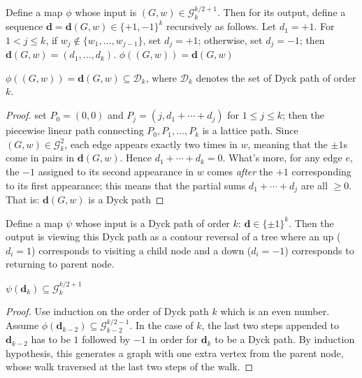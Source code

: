 \begin{definition}\label{def:graph_to_Dyck_map}
   Define a map $\phi$ whose input is $(G, w) \in \mathcal{G}^{k/2 + 1}_k$. Then for its output,
   define a sequence $\mathbf{d}=\mathbf{d}(G,w)\in\{+1,-1\}^k$ recursively as follows.
   Let $d_1=+1$.  For $1<j\le k$, if $w_j\notin\{w_1,\ldots,w_{j-1}\}$, set $d_j=+1$; otherwise, set $d_j=-1$; then
   $\mathbf{d}(G,w) = (d_1,\ldots,d_k)$. $\phi((G,w)) = \mathbf{d}(G,w)$
\end{definition}


\begin{lemma}\label{lem:graph_Dyck_correspondence}
  $\phi((G,w)) = \mathbf{d}(G,w) \subseteq \mathcal{D}_k$, where $\mathcal{D}_k$ denotes the set of Dyck path of order $k$.
  \begin{proof}
    set $P_0 = (0,0)$ and $P_j = (j,d_1+\cdots+d_j)$ for $1\le j\le k$; then the piecewise linear path
    connecting $P_0,P_1,\ldots,P_k$ is a lattice path.  Since $(G,w)\in\mathcal{G}_k^2$, each edge appears exactly two times in $w$,
    meaning that the $\pm1$s come in pairs in $\mathbf{d}(G,w)$.  Hence $d_1+\cdots+d_k=0$.  What's more, for any edge $e$,
    the $-1$ assigned to its second appearance in $w$ comes {\em after} the $+1$ corresponding to its first appearance;
    this means that the partial sums $d_1+\cdots+d_j$ are all $\ge 0$.  That is: $\mathbf{d}(G,w)$ is a Dyck path
  \end{proof}
\end{lemma}


\begin{definition}\label{def:Dyck_to_graph_map}
   Define a map $\psi$ whose input is a Dyck path of order $k$: $\mathbf{d} \in \{\pm1\}^k$. Then the output is viewing
  this Dyck path as a contour reversal of a tree where an up ($d_i = 1$) corresponds to visiting a child node
  and a down ($d_i = -1$) corresponds to returning to parent node.
\end{definition}


\begin{lemma}\label{lem:Dyck_graph_correspondence}
  $\psi(\mathbf{d}_k) \subseteq \mathcal{G}^{k/2 + 1}_k$
  \begin{proof}
    Use induction on the order of Dyck path $k$ which is an even number. Assume $\phi(\mathbf{d}_{k-2})
    \subseteq \mathcal{G}_{k-2}^{k/2 -1}$. In the case of $k$, the last two steps appended to $\mathbf{d}_{k-2}$
    has to be $1$ followed by $-1$ in order for $\mathbf{d}_k$ to be a Dyck path. By induction hypothesis,
    this generates a graph with one extra vertex from the parent node, whose walk traversed at the last two steps of the walk.
  \end{proof}
\end{lemma}


